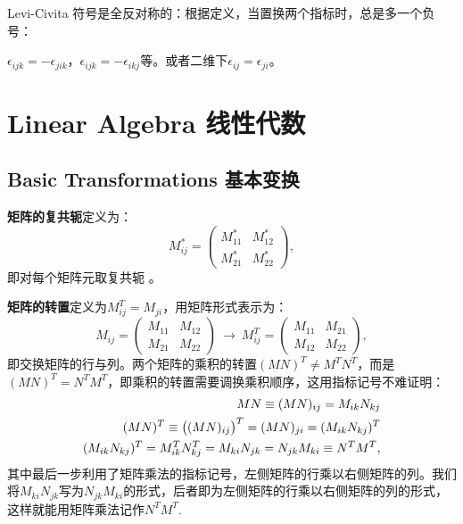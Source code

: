 Levi-Civita 符号是全反对称的：根据定义，当置换两个指标时，总是多一个负号：

$\epsilon_{ijk}=-\epsilon_{jik}$，$\epsilon_{ijk}=-\epsilon_{ikj}$等。或者二维下$\epsilon_{ij}=\epsilon_{ji}$。

\chapter[线性代数]{Linear Algebra 线性代数}
\section[基本变换]{Basic Transformations 基本变换}
\label{appendix.C.1}
{\bf 矩阵的复共轭}定义为：
\begin{equation}
\label{equc.1}
	M^*_{ij} =
		\begin{pmatrix}
			M^*_{11} & M^*_{12} \\
			M^*_{21} & M^*_{22}
		\end{pmatrix},
\end{equation}
即对每个矩阵元取复共轭%
%
。

{\bf 矩阵的转置}定义为$M^T_{ij} = M_{ji}$，用矩阵形式表示为：
\begin{equation}
\label{equC.2}
	M_{ij} =
		\begin{pmatrix}
			M_{11} & M_{12} \\
			M_{21} & M_{22}
		\end{pmatrix}
	\ \to \
	M^T_{ij} =
		\begin{pmatrix}
			M_{11} & M_{21} \\
			M_{12} & M_{22}
		\end{pmatrix},
\end{equation}
即交换矩阵的行与列。两个矩阵的乘积的转置$(MN)^T \neq M^T N^T$，而是$(MN)^T = N^T M^T$，即乘积的转置需要调换乘积顺序，这用指标记号不难证明：
\begin{align}
	MN \equiv (MN)_{ij} = M_{ik} N_{kj} \notag \\
	(MN)^T \equiv \big( (MN)_{ij} \big)^T = (MN)_{ji} = (M_{ik} N_{kj})^T \notag \\
\label{equC.3}
	(M_{ik} N_{kj})^T = M^T_{ik} N^T_{kj} = M_{ki} N_{jk} = N_{jk} M_{ki} \equiv N^T M^T,
\end{align}
其中最后一步利用了矩阵乘法的指标记号，左侧矩阵的行乘以右侧矩阵的列。我们将$M_{ki} N_{jk}$写为$N_{jk} M_{ki}$的形式，后者即为左侧矩阵的行乘以右侧矩阵的列的形式，这样就能用矩阵乘法记作$N^T M^T$.


